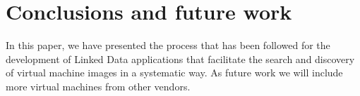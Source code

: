 \section{Conclusions and future work}\label{sec:conclusions} 
In this paper, we have presented the process that has been followed for the development of Linked Data applications that facilitate the search and discovery of virtual machine images in a systematic way. As future work we will include more virtual machines from other vendors.